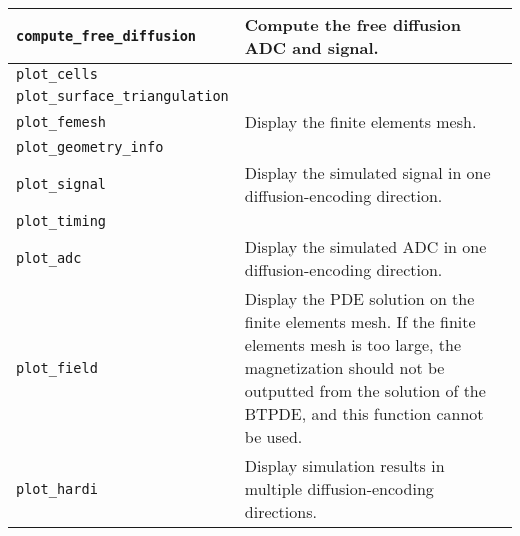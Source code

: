 \begin{tabular}{|l|p{10cm}|}
    \verb+compute_free_diffusion+ & Compute the free diffusion ADC and signal.                                                                                                                                                                  \\ \hline
    \verb+plot_cells+ &                                                                                                                                                                                                             \\ \hline
    \verb+plot_surface_triangulation+ &                                                                                                                                                                                                             \\ \hline
    \verb+plot_femesh+ & Display the finite elements mesh.                                                                                                                                                                           \\ \hline
    \verb+plot_geometry_info+ &                                                                                                                                                                                                             \\ \hline
    \verb+plot_signal+ & Display the simulated signal in one diffusion-encoding direction.                                                                                                                                           \\ \hline
    \verb+plot_timing+ &                                                                                                                                                                                                             \\ \hline
    \verb+plot_adc+ & Display the simulated ADC in one diffusion-encoding direction.                                                                                                                                              \\ \hline
    \verb+plot_field+ & Display the PDE solution on the finite elements mesh. If the finite elements mesh is too large, the magnetization should not be outputted from the solution of the BTPDE, and this function cannot be used. \\ \hline
    \verb+plot_hardi+ & Display simulation results in multiple diffusion-encoding directions.                                                                                                                                       \\ \hline
\end{tabular}
